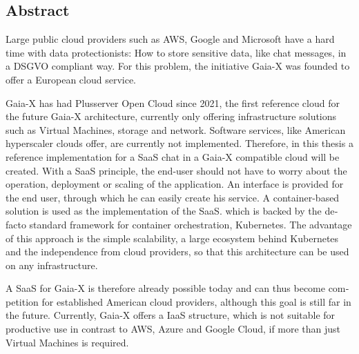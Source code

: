 

\begin{otherlanguage}{american}
	\chapter*{Abstract}
	Large public cloud providers such as AWS, Google and Microsoft have a hard time with data protectionists:
	How to store sensitive data, like chat messages, in a DSGVO compliant way.
	For this problem, the initiative Gaia-X was founded to offer a European cloud service.


	Gaia-X has had Plusserver Open Cloud since 2021, the first reference cloud for the future Gaia-X architecture,
	currently only offering infrastructure solutions such as Virtual Machines, storage and network. 
	Software services, like American hyperscaler clouds offer, are currently not implemented.
	Therefore, in this thesis a reference implementation for a \ac{SaaS} chat in a Gaia-X compatible cloud will be created.
	With a \ac{SaaS} principle, the end-user should not have to worry about the operation, deployment
	or scaling of the application. An interface is provided for the end user, through which he can easily create his service. 
	A container-based solution is used as the implementation of the \ac{SaaS}. which is backed by the defacto standard framework for 
	container orchestration, Kubernetes. The advantage of this approach is the simple scalability, a large ecosystem behind Kubernetes
	and the independence from cloud providers, so that this architecture can be used on any infrastructure.

	A \ac{SaaS} for Gaia-X is therefore already possible today and can thus become competition for established American cloud providers,
	although this goal is still far in the future. Currently, Gaia-X offers a \ac{IaaS} structure, which is not suitable for productive use
	in contrast to AWS, Azure and Google Cloud, if more than just Virtual Machines is required.

\end{otherlanguage}
